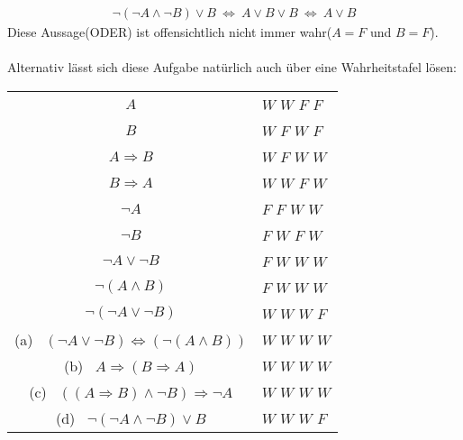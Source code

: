 \begin{align*}
	\neg ( \neg A \wedge \neg  B ) \vee B
	\ \Leftrightarrow \
	A \vee B \vee B 
	\ \Leftrightarrow \ 
	A \vee B
\end{align*}
Diese Aussage(ODER) ist offensichtlich nicht immer wahr($A =F $ und $B = F$).\\
\\
Alternativ lässt sich diese Aufgabe natürlich auch über eine Wahrheitstafel lösen:
\begin{center}
	\begin{tabular}{cllll}
		\hline
		\multicolumn{1}{c|}{$A$} & \multicolumn{4}{l}{$W$ $W$ $F$ $F$} \\
		\multicolumn{1}{c|}{$B$} & \multicolumn{4}{l}{$W$ $F$ $W$ $F$} \\ 
		\hline
		\multicolumn{1}{c|}{$ A \Rightarrow B$} & \multicolumn{4}{l}{$W$ $F$ $W$ $W$} \\
		\multicolumn{1}{c|}{$ B \Rightarrow A$} & \multicolumn{4}{l}{$W$ $W$ $F$ $W$} \\
		\multicolumn{1}{c|}{$ \neg A$} & \multicolumn{4}{l}{$F$ $F$ $W$ $W$} \\
		\multicolumn{1}{c|}{$\neg B$} & \multicolumn{4}{l}{$F$ $W$ $F$ $W$} \\
		\hline
		\multicolumn{1}{c|}{ $ \neg A \vee  \neg B$} & \multicolumn{4}{l}{$F$ $W$ $W$ $W$} \\
		\multicolumn{1}{c|}{$ \neg (A \wedge B)$} & \multicolumn{4}{l}{$F$ $W$ $W$ $W$} \\
		\multicolumn{1}{c|}{$ \neg (\neg A \vee \neg B)$} & \multicolumn{4}{l}{$W$ $W$ $W$ $F$} \\
		\hline
		\multicolumn{1}{c|}{(a) \ $ ( \neg A \vee \neg B ) \Leftrightarrow (\neg  (A \wedge B))$} & \multicolumn{4}{l}{$W$ $W$ $W$ $W$} \\
		\multicolumn{1}{c|}{(b) \ $ A \Rightarrow ( B \Rightarrow A)$} & \multicolumn{4}{l}{$W$ $W$ $W$ $W$} \\  
		\multicolumn{1}{c|}{(c) \ $ ((A \Rightarrow B) \wedge \neg  B) \Rightarrow \neg A$} & \multicolumn{4}{l}{$W$ $W$ $W$ $W$} \\ 	
		\multicolumn{1}{c|}{(d) \ $ \neg ( \neg A \wedge \neg  B ) \vee B$} & \multicolumn{4}{l}{$W$ $W$ $W$ $F$} \\ 
		\hline	
	\end{tabular}
\end{center}

 

\newpage
